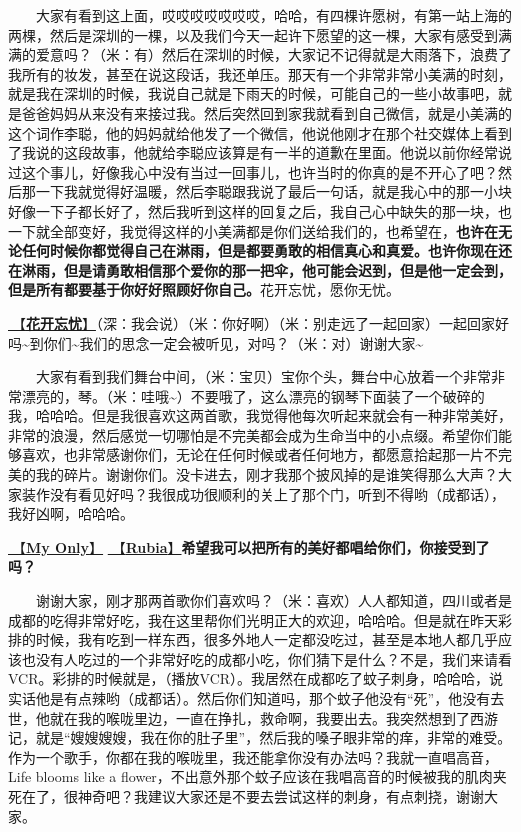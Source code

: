 \documentclass[]{ctexbook}
\begin{document}
  大家有看到这上面，哎哎哎哎哎哎哎，哈哈，有四棵许愿树，有第一站上海的两棵，然后是深圳的一棵，以及我们今天一起许下愿望的这一棵，大家有感受到满满的爱意吗？（米：有）然后在深圳的时候，大家记不记得就是大雨落下，浪费了我所有的妆发，甚至在说这段话，我还单压。那天有一个非常非常小美满的时刻，就是我在深圳的时候，我说自己就是下雨天的时候，可能自己的一些小故事吧，就是爸爸妈妈从来没有来接过我。然后突然回到家我就看到自己微信，就是小美满的这个词作李聪，他的妈妈就给他发了一个微信，他说他刚才在那个社交媒体上看到了我说的这段故事，他就给李聪应该算是有一半的道歉在里面。他说以前你经常说过这个事儿，好像我心中没有当过一回事儿，也许当时的你真的是不开心了吧？然后那一下我就觉得好温暖，然后李聪跟我说了最后一句话，就是我心中的那一小块好像一下子都长好了，然后我听到这样的回复之后，我自己心中缺失的那一块，也一下就全部变好，我觉得这样的小美满都是你们送给我们的，也希望在，\textbf{也许在无论任何时候你都觉得自己在淋雨，但是都要勇敢的相信真心和真爱。也许你现在还在淋雨，但是请勇敢相信那个爱你的那一把伞，他可能会迟到，但是他一定会到，但是所有都要基于你好好照顾好你自己。}花开忘忧，愿你无忧。

\hyperref[no-worries]{🎵【\textbf{花开忘忧}】}（深：我会说）（米：你好啊）（米：别走远了一起回家）一起回家好吗\textasciitilde 到你们\textasciitilde 我们的思念一定会被听见，对吗？（米：对）谢谢大家\textasciitilde{}

  大家有看到我们舞台中间，（米：宝贝）宝你个头，舞台中心放着一个非常非常漂亮的，琴。（米：哇哦\textasciitilde）不要哦了，这么漂亮的钢琴下面装了一个破碎的我，哈哈哈。但是我很喜欢这两首歌，我觉得他每次听起来就会有一种非常美好，非常的浪漫，然后感觉一切哪怕是不完美都会成为生命当中的小点缀。希望你们能够喜欢，也非常感谢你们，无论在任何时候或者任何地方，都愿意拾起那一片不完美的我的碎片。谢谢你们。没卡进去，刚才我那个披风掉的是谁笑得那么大声？大家装作没有看见好吗？我很成功很顺利的关上了那个门，听到不得哟（成都话），我好凶啊，哈哈哈。

\hyperref[my-only]{🎵【\textbf{My Only}】} \hyperref[rubia]{🎵【\textbf{Rubia}】}\textbf{希望我可以把所有的美好都唱给你们，你接受到了吗？}

  谢谢大家，刚才那两首歌你们喜欢吗？（米：喜欢）人人都知道，四川或者是成都的吃得非常好吃，我在这里帮你们光明正大的欢迎，哈哈哈。但是就在昨天彩排的时候，我有吃到一样东西，很多外地人一定都没吃过，甚至是本地人都几乎应该也没有人吃过的一个非常好吃的成都小吃，你们猜下是什么？不是，我们来请看VCR。彩排的时候就是，（播放VCR）。我居然在成都吃了蚊子刺身，哈哈哈，说实话他是有点辣哟（成都话）。然后你们知道吗，那个蚊子他没有``死''，他没有去世，他就在我的喉咙里边，一直在挣扎，救命啊，我要出去。我突然想到了西游记，就是``嫂嫂嫂嫂，我在你的肚子里''，然后我的嗓子眼非常的痒，非常的难受。作为一个歌手，你都在我的喉咙里，我还能拿你没有办法吗？我就一直唱高音，Life blooms like a flower，不出意外那个蚊子应该在我唱高音的时候被我的肌肉夹死在了，很神奇吧？我建议大家还是不要去尝试这样的刺身，有点刺挠，谢谢大家。
\end{document}
